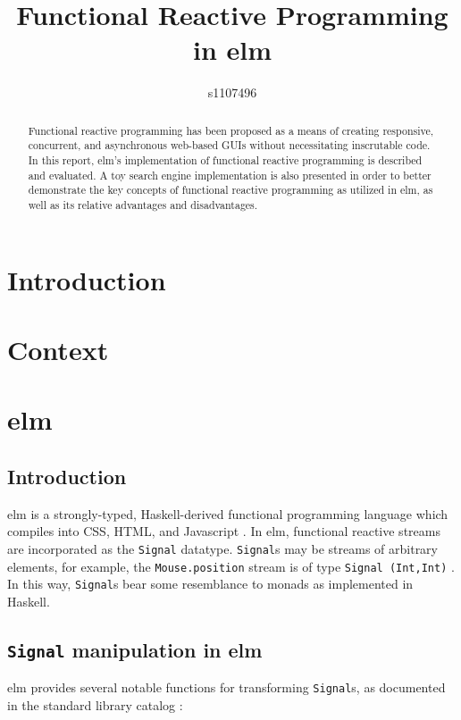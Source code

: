 \documentclass[12pt]{article}
\begin{document}
\title{Functional Reactive Programming in elm}
\author{s1107496}

\maketitle

\begin{abstract}
Functional reactive programming has been proposed as a means of 
creating responsive, concurrent, and asynchronous web-based GUIs without necessitating inscrutable code. In this report, elm's implementation of functional reactive programming
is described and evaluated. A toy search engine implementation is also
presented in order to better demonstrate the key concepts of functional
reactive programming as utilized in elm, as well as its relative advantages 
and disadvantages.
\end{abstract}

\section{Introduction}

\section{Context}

\section{elm}
\subsection{Introduction}
elm is a strongly-typed, Haskell-derived functional programming language which compiles into CSS, HTML, and Javascript \citep{czaplicki_chong_2013}. In elm, functional reactive streams are incorporated as the \texttt{Signal} datatype. \texttt{Signal}s may be streams of arbitrary elements, for example, the \texttt{Mouse.position} stream is of type \texttt{Signal (Int,Int)} \citep*{elm_mouse}. In this way, \texttt{Signal}s bear some resemblance to monads as implemented in Haskell.

\subsection{\texttt{Signal} manipulation in elm}
elm provides several notable functions for transforming \texttt{Signal}s, as documented in the standard library catalog \citep{elm_signal}:
\end{document}
